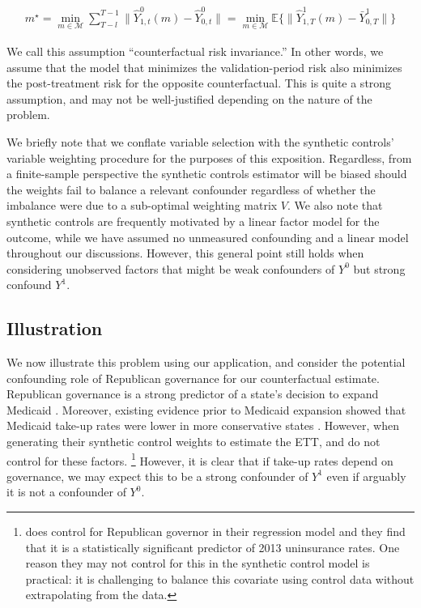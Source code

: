 \begin{align*}\label{assumption:second}
m^\star = \min_{m \in \mathcal{M}}\sum_{T - l}^{T-1}\|\hat{Y}^0_{1, t}(m) - \hat{Y}^0_{0, t}\| = \min_{m \in \mathcal{M}}\mathbb{E}\{\|\hat{Y}^1_{1, T}(m) - \bar{Y}^1_{0, T}\|\}
\end{align*}

We call this assumption ``counterfactual risk invariance.'' In other words, we assume that the model that minimizes the validation-period risk also minimizes the post-treatment risk for the opposite counterfactual. This is quite a strong assumption, and may not be well-justified depending on the nature of the problem. 

We briefly note that we conflate variable selection with the synthetic controls' variable weighting procedure for the purposes of this exposition. Regardless, from a finite-sample perspective the synthetic controls estimator will be biased should the weights fail to balance a relevant confounder regardless of whether the imbalance were due to a sub-optimal weighting matrix $V$. We also note that synthetic controls are frequently motivated by a linear factor model for the outcome, while we have assumed no unmeasured confounding and a linear model throughout our discussions. However, this general point still holds when considering unobserved factors that might be weak confounders of $Y^0$ but strong confound $Y^1$.

\subsection{Illustration}

We now illustrate this problem using our application, and consider the potential confounding role of Republican governance for our counterfactual estimate. Republican governance is a strong predictor of a state's decision to expand Medicaid \cite{courtemanche2017early}. Moreover, existing evidence prior to Medicaid expansion showed that Medicaid take-up rates were lower in more conservative states \cite{sommers2012understanding}. However, when generating their synthetic control weights to estimate the ETT, \cite{courtemanche2017early} and \cite{kaestner2017effects} do not control for these factors. \footnote{\cite{courtemanche2017early} does control for Republican governor in their regression model and they find that it is a statistically significant predictor of 2013 uninsurance rates. One reason they may not control for this in the synthetic control model is practical: it is challenging to balance this covariate using control data without extrapolating from the data.} However, it is clear that if take-up rates depend on governance, we may expect this to be a strong confounder of $Y^1$  even if arguably it is not a confounder of $Y^0$.

